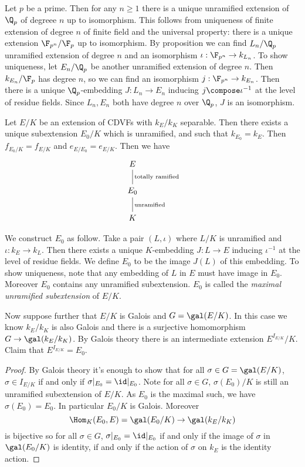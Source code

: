 \documentclass[a4paper]{article}
\begin{document}
\begin{eg}
  Let \(p\) be a prime. Then for any \(n \geq 1\) there is a unique unramified extension of \(\Q_p\) of degreee \(n\) up to isomorphism. This follows from uniqueness of finite extension of degree \(n\) of finite field and the universal property: there is a unique extension \(\F_{p^n}/\F_p\) up to isomorphism. By proposition we can find \(L_n/\Q_p\) unramified extension of degree \(n\) and an isomorphism \(\iota: \F_{p^n} \to k_{L_n}\). To show uniqueness, let \(E_n/\Q_p\) be another unramified extension of degree \(n\). Then \(k_{E_n}/\F_p\) has degree \(n\), so we can find an isomorphism \(j: \F_{p^n} \to k_{E_n}\). Then there is a unique \(\Q_p\)-embedding \(J: L_n \to E_n\) inducing \(j \compose \iota^{-1}\) at the level of residue fields. Since \(L_n, E_n\) both have degree \(n\) over \(\Q_p\), \(J\) is an isomorphism.
\end{eg}

Let \(E/K\) be an extension of CDVFs with \(k_E/k_K\) separable. Then there exists a unique subextension \(E_0/K\) which is unramified, and such that \(k_{E_0} = k_E\). Then \(f_{E_0/K} = f_{E/K}\) and \(e_{E/E_0} = e_{E/K}\). Then we have
\[
  \begin{tikzcd}
    E \ar[d, dash, "\text{totally ramified}"] \\
    E_0 \ar[d, dash, "\text{unramified}"] \\
    K
  \end{tikzcd}
\]

We construct \(E_0\) as follow. Take a pair \((L, \iota)\) where \(L/K\) is unramified and \(\iota: k_E \to k_L\). Then there exists a unique \(K\)-embedding \(J: L \to E\) inducing \(\iota^{-1}\) at the level of residue fields. We define \(E_0\) to be the image \(J(L)\) of this embedding. To show uniqueness, note that any embedding of \(L\) in \(E\) must have image in \(E_0\). Moreover \(E_0\) contains any unramified subextension. \(E_0\) is called the \emph{maximal unramified subextension} of \(E/K\).

Now suppose further that \(E/K\) is Galois and \(G = \gal(E/K)\). In this case we know \(k_E/k_K\) is also Galois and there is a surjective homomorphism \(G \to \gal(k_E/k_K)\). By Galois theory there is an intermediate extension \(E^{I_{E/K}}/K\). Claim that \(E^{I_{E/K}} = E_0\).

\begin{proof}
  By Galois theory it's enough to show that for all \(\sigma \in G = \gal(E/K)\), \(\sigma \in I_{E/K}\) if and only if \(\sigma|_{E_0} = \id|_{E_0}\). Note for all \(\sigma \in G\), \(\sigma(E_0)/K\) is still an unramified subextension of \(E/K\). As \(E_0\) is the maximal such, we have \(\sigma(E_0) = E_0\). In particular \(E_0/K\) is Galois. Moreover
  \[
    \Hom_K(E_0, E) = \gal(E_0/K) \to \gal(k_E/k_K)
  \]
  is bijective so for all \(\sigma \in G\), \(\sigma|_{E_0} = \id|_{E_0}\) if and only if the image of \(\sigma\) in \(\gal(E_0/K)\) is identity, if and only if the action of \(\sigma\) on \(k_E\) is the identity action.
\end{proof}
\end{document}

